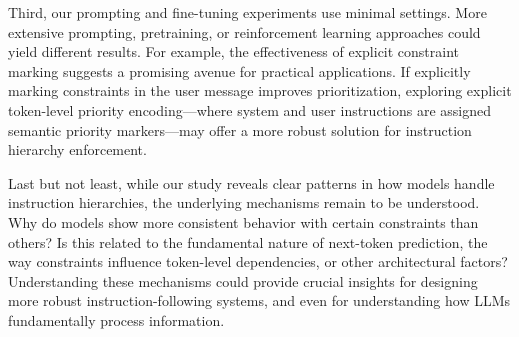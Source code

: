Third, our prompting and fine-tuning experiments use minimal settings. More extensive prompting, pretraining, or reinforcement learning approaches could yield different results. For example, the effectiveness of explicit constraint marking suggests a promising avenue for practical applications. If explicitly marking constraints in the user message improves prioritization, exploring explicit token-level priority encoding—where system and user instructions are assigned semantic priority markers—may offer a more robust solution for instruction hierarchy enforcement.

Last but not least, while our study reveals clear patterns in how models handle instruction hierarchies, the underlying mechanisms remain to be understood. Why do models show more consistent behavior with certain constraints than others? Is this related to the fundamental nature of next-token prediction, the way constraints influence token-level dependencies, or other architectural factors? Understanding these mechanisms could provide crucial insights for designing more robust instruction-following systems, and even for understanding how LLMs fundamentally process information.